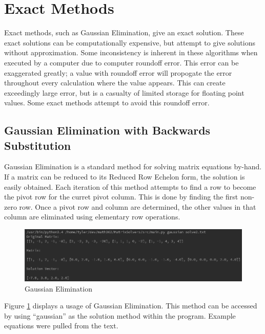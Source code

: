 \documentclass[12pt]{article}
\begin{document}
\section{Exact Methods}

Exact methods, such as Gaussian Elimination, give an exact solution. These 
exact solutions can be computationally expensive, but attempt to give solutions
without approximation\cite{numerical}. Some inconsistency is inherent in these 
algorithms when executed by a computer due to computer roundoff
error\cite{numerical}. This error can be exaggerated greatly; a value with roundoff error 
will propogate the error throughout every calculation where the value appears\cite{numerical}.
This can create exceedingly large error, but is a casualty of limited storage 
for floating point values. Some exact methods attempt to avoid this roundoff 
error\cite{numerical}.

\subsection{Gaussian Elimination with Backwards Substitution}
Gaussian Elimination is a standard method for solving matrix equations by-hand. If a 
matrix can be reduced to its Reduced Row Echelon form, the solution is easily
obtained. Each iteration of this method attempts to find a row to become the 
pivot row for the curret pivot column. This is done by finding the first non-zero
row. Once a pivot row and column are determined, the other values in that column
are eliminated using elementary row operations. 

\begin{figure}[H]
\begin{center}
\includegraphics[scale=.5]{gaussian.png}
\caption{Gaussian Elimination}
\label{gaussian}
\end{center}
\end{figure}

Figure \ref{gaussian} displays a usage of Gaussian Elimination. This method can be accessed by using ``gaussian'' as the solution method
within the program. Example equations were pulled from the text\cite{numerical}.
\end{document}
